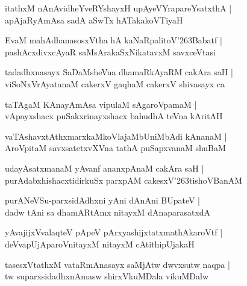\documentclass[twoside,12pt,openright]{book}
\def\S{\char'263}
\newcounter{shloka}[chapter]
\begin{document}
\begin{shloka}
itathxM nAnAvidheYveRYshayxH upAyeVYrapareYsatxthA |\\
apAjaRyAmAsa sadA aSwTx hATakakoVTiyaH 
\end{shloka}

\begin{shloka}
EvaM mahAdhanasosxVtha hA kaNaRpalitoV\S Babatf |\\
pashAcxdivxcAyaR saMsArakaSxNikatavxM savxceVtasi 
\end{shloka}

\begin{shloka}
tadadhxnasayx SaDaMsheVna dhamaRkAyaRM cakAra saH |\\
viSoNxVrAyatanaM cakerxV gaqhaM cakerxV shivasayx ca 
\end{shloka}

\begin{shloka}
taTAgaM KAnayAmAsa vipulaM sAgaroVpamaM |\\
vApayxshacx puSakxrinayxshacx bahudhA teVna kAritAH
\end{shloka}

\begin{shloka}
vaTAshavxtAthxmarxkaMkoVlajaMbUniMbAdi kAnanaM |\\
AroVpitaM savxsatetxvXVna tathA puSapxvanaM shuBaM 
\end{shloka}

\begin{shloka}
udayAsatxmanaM yAvanf ananxpAnaM cakAra saH |\\
purAdabxhishacxtidirkuSx parxpAM cakesxV\S tishoVBanAM 
\end{shloka}

\begin{shloka}
purANeVSu-parxsidAdhxni yAni dAnAni BUpateV |\\
dadw tAni sa dhamARtAmx nitayxM dAnaparasatxdA 
\end{shloka}

\begin{shloka}
yAvajijxVvalaqteV pApeV pArxyashijxtatxmathAkaroVtf |\\
deVvapUjAparoVnitayxM nitayxM cAtithipUjakaH 
\end{shloka}

\begin{shloka}
tasesxVtathxM vataRmAnasayx saMjAtw dwvxsutw naqpa |\\
tw suparxsidadhxnAmasw shirxVkuMDala vikuMDalw
\end{shloka}
\end{document}
